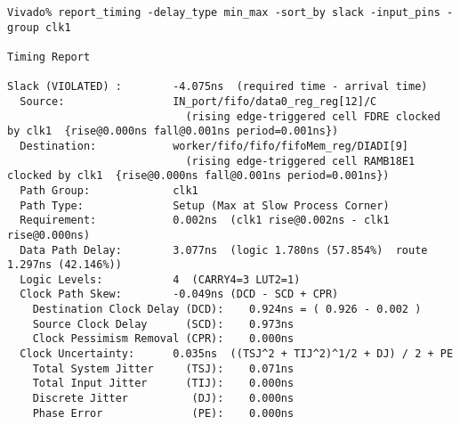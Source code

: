 \documentclass{article}
\begin{document}
\begin{lstlisting}
Vivado% report_timing -delay_type min_max -sort_by slack -input_pins -group clk1

Timing Report

Slack (VIOLATED) :        -4.075ns  (required time - arrival time)
  Source:                 IN_port/fifo/data0_reg_reg[12]/C
                            (rising edge-triggered cell FDRE clocked by clk1  {rise@0.000ns fall@0.001ns period=0.001ns})
  Destination:            worker/fifo/fifo/fifoMem_reg/DIADI[9]
                            (rising edge-triggered cell RAMB18E1 clocked by clk1  {rise@0.000ns fall@0.001ns period=0.001ns})
  Path Group:             clk1
  Path Type:              Setup (Max at Slow Process Corner)
  Requirement:            0.002ns  (clk1 rise@0.002ns - clk1 rise@0.000ns)
  Data Path Delay:        3.077ns  (logic 1.780ns (57.854%)  route 1.297ns (42.146%))
  Logic Levels:           4  (CARRY4=3 LUT2=1)
  Clock Path Skew:        -0.049ns (DCD - SCD + CPR)
    Destination Clock Delay (DCD):    0.924ns = ( 0.926 - 0.002 ) 
    Source Clock Delay      (SCD):    0.973ns
    Clock Pessimism Removal (CPR):    0.000ns
  Clock Uncertainty:      0.035ns  ((TSJ^2 + TIJ^2)^1/2 + DJ) / 2 + PE
    Total System Jitter     (TSJ):    0.071ns
    Total Input Jitter      (TIJ):    0.000ns
    Discrete Jitter          (DJ):    0.000ns
    Phase Error              (PE):    0.000ns


\end{lstlisting}
\end{document}
